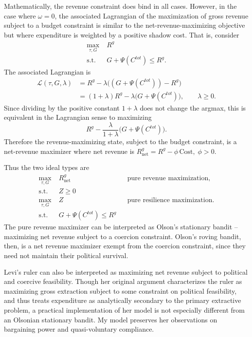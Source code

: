 \documentclass[12pt]{article}
\begin{document}
Mathematically, the revenue constraint does bind in all cases. However, in the case where $\omega = 0$, the associated Lagrangian of the maximization of gross revenue subject to a budget constraint is similar to the net-revenue-maximizing objective but where expenditure is weighted by a positive shadow cost. That is, consider
\begin{align*}
\max_{\tau, G} \;& R^g \\
\text{s.t.} \;& G + \Psi(C^{tot}) \le R^g.
\end{align*}
The associated Lagrangian is
\begin{align*}
\mathcal{L}(\tau,G,\lambda)
&= R^g - \lambda \Big((G + \Psi(C^{tot})) - R^g\Big) \\
&= (1+\lambda)R^g - \lambda\big(G + \Psi(C^{tot})\big), \qquad \lambda \ge 0.
\end{align*}
Since dividing by the positive constant $1+\lambda$ does not change the argmax, this is equivalent in the Lagrangian sense to maximizing
\begin{equation}
R^g - \frac{\lambda}{1+\lambda}\big(G + \Psi(C^{tot})\big).
\end{equation}
Therefore the revenue-maximizing state, subject to the budget constraint, is a net-revenue maximizer where net revenue is $R^g_{\text{net}} = R^g - \phi \, \text{Cost}, \; \phi > 0$.

Thus the two ideal types are
\begin{align*}
\max_{\tau, G} \;& R^g_{\text{net}} && \text{pure revenue maximization},\\
\text{s.t.} \;& Z \ge 0 \\
\max_{\tau, G} \;& Z && \text{pure resilience maximization}. \\
\text{s.t.} \;& G + \Psi(C^{tot}) \le R^g
\end{align*}
The pure revenue maximizer can be interpreted as Olson's stationary bandit -- maximizing net revenue subject to a coercion constraint. Olson's roving bandit, then, is a net revenue maximizer exempt from the coercion constraint, since they need not maintain their political survival.

Levi’s ruler can also be interpreted as maximizing net revenue subject to political and coercive feasibility. Though her original argument characterizes the ruler as maximizing gross extraction subject to some constraint on political feasibility, and thus treats expenditure as analytically secondary to the primary extractive problem, a practical implementation of her model is not especially different from an Olsonian stationary bandit. My model preserves her observations on bargaining power and quasi-voluntary compliance.
\end{document}
